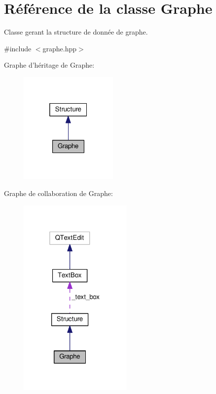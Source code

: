 \hypertarget{classGraphe}{\section{Référence de la classe Graphe}
\label{classGraphe}
}


Classe gerant la structure de donnée de graphe.  




{\ttfamily \#include $<$graphe.\+hpp$>$}



Graphe d'héritage de Graphe\+:\nopagebreak
\begin{figure}[H]
\begin{center}
\leavevmode
\includegraphics[width=136pt]{classGraphe__inherit__graph}
\end{center}
\end{figure}


Graphe de collaboration de Graphe\+:\nopagebreak
\begin{figure}[H]
\begin{center}
\leavevmode
\includegraphics[width=157pt]{classGraphe__coll__graph}
\end{center}
\end{figure}
